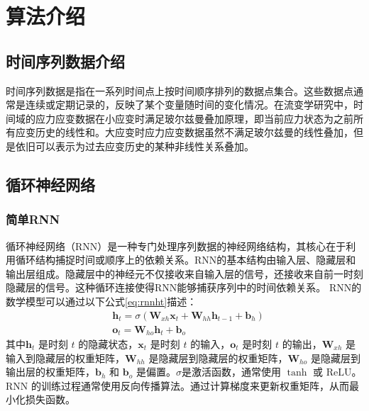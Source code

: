 \section{算法介绍}
\subsection{时间序列数据介绍}
时间序列数据是指在一系列时间点上按时间顺序排列的数据点集合。这些数据点通常是连续或定期记录的，反映了某个变量随时间的变化情况。在流变学研究中，时间域的应力应变数据在小应变时满足玻尔兹曼叠加原理，即当前应力状态为之前所有应变历史的线性和\cite{boltzmannZurTheorieElastischen1878}。大应变时应力应变数据虽然不满足玻尔兹曼的线性叠加，但是依旧可以表示为过去应变历史的某种非线性关系叠加。
\subsection{循环神经网络}
\subsubsection{简单RNN}
循环神经网络（RNN）是一种专门处理序列数据的神经网络结构，其核心在于利用循环结构捕捉时间或顺序上的依赖关系\cite{elmanFindingStructureTime1990}。RNN的基本结构由输入层、隐藏层和输出层组成。隐藏层中的神经元不仅接收来自输入层的信号，还接收来自前一时刻隐藏层的信号。这种循环连接使得RNN能够捕获序列中的时间依赖关系。
RNN的数学模型可以通过以下公式\eqref{eq:rnnht}描述：
\begin{align}
   & \mathbf{h}_t = \sigma(\mathbf{W}_{xh} \mathbf{x}_t + \mathbf{W}_{hh} \mathbf{h}_{t-1} + \mathbf{b}_h) \label{eq:rnnht} \\
   & {\mathbf{o}_t = \mathbf{W}_{ho} \mathbf{h}_t + \mathbf{b}_o} \label{eq:rnnot}
\end{align}
其中$\mathbf{h}_t$ 是时刻 $t$ 的隐藏状态，$\mathbf{x}_t$ 是时刻 $t$ 的输入，$\mathbf{o}_t$ 是时刻 $t$ 的输出，$\mathbf{W}_{xh}$ 是输入到隐藏层的权重矩阵，$\mathbf{W}_{hh}$ 是隐藏层到隐藏层的权重矩阵，$\mathbf{W}_{ho}$ 是隐藏层到输出层的权重矩阵，$\mathbf{b}_h$ 和 $\mathbf{b}_o$ 是偏置。$\sigma$是激活函数，通常使用 $\tanh$ 或 $\text{ReLU}$。RNN 的训练过程通常使用反向传播算法。通过计算梯度来更新权重矩阵，从而最小化损失函数。

